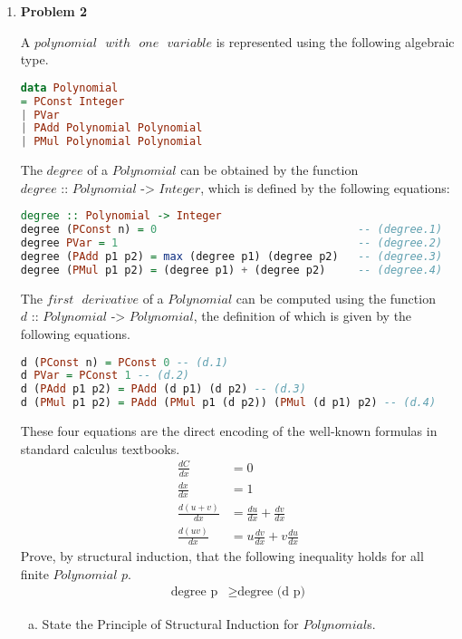 \documentclass[11pt]{article}
\theoremstyle{definition}
\begin{document}
\begin{enumerate} \itemsep 20pt

\item[] \textbf{Problem 2}

A $polynomial\text{ }with\text{ }one\text{ }variable$ is represented using the following algebraic type.
\begin{lstlisting}[language=Haskell]
data Polynomial
= PConst Integer
| PVar
| PAdd Polynomial Polynomial
| PMul Polynomial Polynomial
\end{lstlisting}
The $degree$ of a $Polynomial$ can be obtained by the function $degree\text{ :: }Polynomial\text{ -> }Integer$, which is
defined by the following equations:
\begin{lstlisting}[language=Haskell]
degree :: Polynomial -> Integer
degree (PConst n) = 0                               -- (degree.1)
degree PVar = 1                                     -- (degree.2)
degree (PAdd p1 p2) = max (degree p1) (degree p2)   -- (degree.3)
degree (PMul p1 p2) = (degree p1) + (degree p2)     -- (degree.4)
\end{lstlisting}
The $first\text{ }derivative$ of a $Polynomial$ can be computed using the function $d\text{ :: }Polynomial\text{ -> }Polynomial$,
the definition of which is given by the following equations.
\begin{lstlisting}[language=Haskell]
d (PConst n) = PConst 0 -- (d.1)
d PVar = PConst 1 -- (d.2)
d (PAdd p1 p2) = PAdd (d p1) (d p2) -- (d.3)
d (PMul p1 p2) = PAdd (PMul p1 (d p2)) (PMul (d p1) p2) -- (d.4)
\end{lstlisting}
These four equations are the direct encoding of the well-known formulas in standard calculus textbooks.
\begin{align*}
\frac{dC}{dx} &= 0 \\
\frac{dx}{dx} &= 1 \\
\frac{d(u+v)}{dx} &= \frac{du}{dx} + \frac{dv}{dx} \\
\frac{d(uv)}{dx} &= u\frac{dv}{dx} + v\frac{du}{dx}
\end{align*}
Prove, by structural induction, that the following inequality holds for all finite $Polynomial$ $p$.
\begin{align*}
\text{degree p} &\geq \text{degree (d p)} \tag{1}
\end{align*}
\begin{enumerate}[(a)]
\item State the Principle of Structural Induction for $Polynomial$s.


\end{enumerate}
\end{enumerate}
\end{document}
